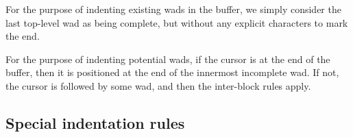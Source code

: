For the purpose of indenting existing wads in the buffer, we simply
consider the last top-level wad as being complete, but without any
explicit characters to mark the end.

For the purpose of indenting potential wads, if the cursor is at the
end of the buffer, then it is positioned at the end of the innermost
incomplete wad.  If not, the cursor is followed by some wad, and then
the inter-block rules apply.








\subsection{Special indentation rules}


